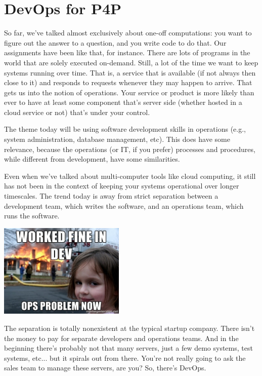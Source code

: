 \documentclass[a4paper]{report}
\begin{document}
\section*{DevOps for P4P}
So far, we've talked almost exclusively about one-off computations:
you want to figure out the answer to a question, and you write code to
do that. Our assignments have been like that, for instance. There are lots
of programs in the world that are solely executed on-demand. Still, a lot
of the time we want to keep systems running over time. That is, a service
that is available (if not always then close to it) and responds to requests
whenever they may happen to arrive. That gets us
into the notion of operations. Your service or product is more likely than 
ever to have at least some component that's server side (whether hosted
in a cloud service or not) that's under your control.

The theme today will be using software development skills in
operations (e.g., system administration, database management, etc). This
does have some relevance, because the operations (or IT, if you prefer)
processes and procedures, while different from development, have some
similarities. 

Even when we've talked about multi-computer tools like cloud
computing, it still has not been in the context of keeping your
systems operational over longer timescales. The trend today is away
from strict separation between a development team, which writes the
software, and an operations team, which runs the software.

\begin{center}
	\includegraphics[width=0.45\textwidth]{images/devops.jpg}
\end{center}

The separation is totally nonexistent at the typical startup company. There isn't the money to pay for separate developers and operations teams. And in the beginning there's probably not that many servers, just a few demo systems, test systems, etc... but it spirals out from there. You're not really going to ask the sales team to manage these servers, are you? So, there's DevOps. 
\end{document}
